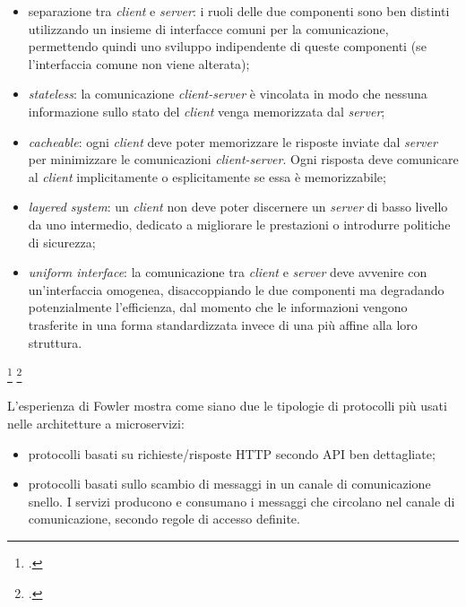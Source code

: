 \begin{itemize}
  \item separazione tra \emph{client} e \emph{server}: i ruoli delle due componenti sono ben distinti utilizzando un insieme di interfacce comuni per la comunicazione, permettendo quindi uno sviluppo indipendente di queste componenti (se l'interfaccia comune non viene alterata);
  \item \emph{stateless}: la comunicazione \emph{client-server} è vincolata in modo che nessuna informazione sullo stato del \emph{client} venga memorizzata dal \emph{server};
  \item \emph{cacheable}: ogni \emph{client} deve poter memorizzare le risposte inviate dal \emph{server} per minimizzare le comunicazioni \emph{client-server}. Ogni risposta deve comunicare al \emph{client} implicitamente o esplicitamente se essa è memorizzabile;
  \item \emph{layered system}: un \emph{client} non deve poter discernere un \emph{server} di basso livello da uno intermedio, dedicato a migliorare le prestazioni o introdurre politiche di sicurezza;
  \item \emph{uniform interface}: la comunicazione tra \emph{client} e \emph{server} deve avvenire con un'interfaccia omogenea, disaccoppiando le due componenti ma degradando potenzialmente l'efficienza, dal momento che le informazioni vengono trasferite in una forma standardizzata invece di una più affine alla loro struttura.
\end{itemize}
\footcite{site:rest-wiki}
\footcite{rest-thesis}

L'esperienza di Fowler mostra come siano due le tipologie di protocolli più usati nelle architetture a microservizi:
\begin{itemize}
  \item protocolli basati su richieste/risposte HTTP secondo API ben dettagliate;
  \item protocolli basati sullo scambio di messaggi in un canale di comunicazione snello. I servizi producono e consumano i messaggi che circolano nel canale di comunicazione, secondo regole di accesso definite.
\end{itemize}

